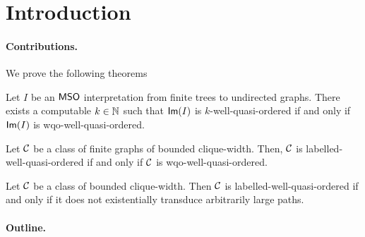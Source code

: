 \section{Introduction}
\label{sec:introduction}

\paragraph*{Contributions.}
We prove the following theorems

\begin{theorem}
    \label{effective-image:thm}
    Let $I$ be an $\mathsf{MSO}$ interpretation
    from finite trees to undirected graphs.
    There exists a computable $k \in \mathbb{N}$
    such that $\mathsf{Im}(I)$
    is $k$-well-quasi-ordered
    if and only if 
    $\mathsf{Im}(I)$ is wqo-well-quasi-ordered.
\end{theorem}

\begin{theorem}
    \label{pouzet-2:thm}
    Let $\mathcal{C}$ be a class of finite graphs of bounded clique-width.
    Then, $\mathcal{C}$ is labelled-well-quasi-ordered
    if and only if 
    $\mathcal{C}$ is wqo-well-quasi-ordered.
\end{theorem}

\begin{theorem}
    \label{transductions-paths:thm}
    Let $\mathcal{C}$ be a class of bounded clique-width.
    Then $\mathcal{C}$ is labelled-well-quasi-ordered
    if and only if
    it does not existentially transduce
    arbitrarily large paths.
\end{theorem}

\paragraph*{Outline.}

